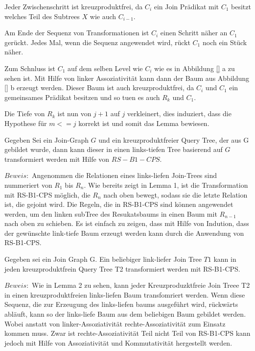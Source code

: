 Jeder Zwischenschritt ist kreuzproduktfrei, da $C_i$ ein Join Prädikat mit $C_1$ besitzt welches Teil des Subtrees $X$  wie auch $C_{i-1}$.

Am Ende der Sequenz von Transformationen ist $C_i$ einen Schritt näher an $C_1$ gerückt. Jedes Mal, wenn die Sequenz angewendet wird, rückt $C_1$ noch ein Stück näher.

Zum Schnluss ist $C_1$ auf dem selben Level wie $C_i$ wie es in Abbildung \ref{} a zu sehen ist.  Mit Hilfe von linker Assoziativität kann dann der Baum aus Abbildung \ref{} b erzeugt werden.  Dieser Baum ist auch kreuzproduktfrei, da $C_i$ und $C_1$ ein gemeinsames Prädikat besitzen und so tuen es auch $R_k$ und $C_1$.

Die Tiefe von $R_k$ ist nun von $j + 1$ auf $j$ verkleinert, dies induziert, dass die Hypothese für $m <= j$ korrekt ist und somit das Lemma bewiesen.


\begin{lem}
Gegeben Sei ein Join-Graph $G$ und ein kreuzproduktfreier Query Tree, der aus G gebildet wurde, dann kann dieser in einen links-tiefen Tree basierend auf $G$ transformiert werden mit Hilfe von $RS-B1-CPS$.


\end{lem}

$Beweis:$ Angenommen die Relationen eines links-liefen Join-Trees sind nummeriert von $R_1$ bis $R_n$. Wie bereits zeigt in Lemma 1, ist die Transformation mit RS-B1-CPS möglich, die $R_n$ nach oben bewegt, sodass sie die letzte Relation ist, die gejoint wird. Die Regeln, die in RS-B1-CPS sind können angewendet werden, um den linken subTree des Resukatsbaums in einen Baum mit $R_{n-1}$ nach oben zu schieben. Es ist einfach zu zeigen, dass mit Hilfe von Indution, dass der gewünschte link-tiefe Baum erzeugt werden kann durch die Anwendung von RS-B1-CPS.

\begin{lem}
Gegeben sei ein Join Graph G. Ein beliebiger link-liefer Join Tree $T1$ kann in jeden kreuzproduktfrein Query Tree T2 transformiert werden mit RS-B1-CPS.
\end{lem}

$Beweis:$ Wie in Lemma 2 zu sehen, kann jeder Kreuzproduzktfreie Join Treee T2 in einen kreuzproduktfreien links-liefen Baum transfomriert werden. Wenn diese Sequenz, die zur Erzeugung des links-liefen baums ausgeführt wird, rückwärts abläuft, kann so der links-liefe Baum aus dem beliebigen Baum gebildet werden. Wobei anstatt von linker-Assoziativität rechte-Assoziativität zum Einsatz kommen muss. Zwar ist rechte-Assoziativität Teil nicht Teil von RS-B1-CPS kann jedoch mit Hilfe von Assoziativität und Kommutativität hergestellt werden. 
 

